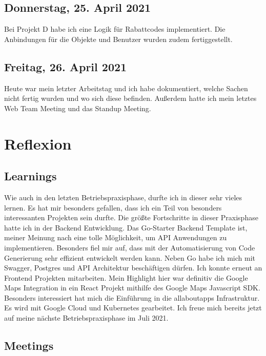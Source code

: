 \section{Donnerstag, 25. April 2021}
Bei Projekt D habe ich eine Logik für Rabattcodes implementiert. Die Anbindungen für die Objekte und Benutzer wurden zudem fertiggestellt.

\section{Freitag, 26. April 2021}
Heute war mein letzter Arbeitstag und ich habe dokumentiert, welche Sachen nicht fertig wurden und wo sich diese befinden. Außerdem hatte ich mein letztes Web Team Meeting und das Standup Meeting.


\chapter {Reflexion}

\section{Learnings}

Wie auch in den letzten Betriebspraxisphase, durfte ich in dieser sehr vieles lernen. Es hat mir besonders gefallen, dass ich ein Teil von besonders interessanten Projekten sein durfte. Die größte Fortschritte in dieser Praxisphase hatte ich in der Backend Entwicklung. Das Go-Starter\cite{gostarter} Backend Template ist, meiner Meinung nach eine tolle Möglichkeit, um API Anwendungen zu implementieren. Besonders fiel mir auf, dass mit der Automatisierung von Code Generierung sehr effizient entwickelt werden kann. Neben Go habe ich mich mit Swagger, Postgres und API Architektur beschäftigen dürfen. \newline
Ich konnte erneut an Frontend Projekten mitarbeiten. Mein Highlight hier war definitiv die Google Maps Integration in ein React\cite{react} Projekt mithilfe des Google Maps Javascript SDK. Besonders interessiert hat mich die Einführung in die allaboutapps Infrastruktur. Es wird mit Google Cloud und Kubernetes gearbeitet. Ich freue mich bereits jetzt auf meine nächste Betriebspraxisphase im Juli 2021.

\section{Meetings}

